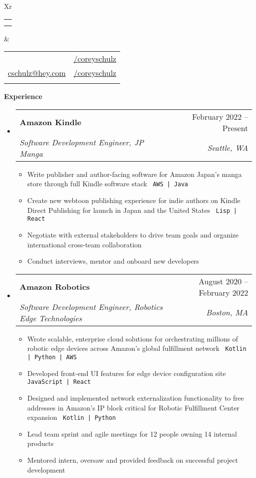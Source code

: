 \documentclass[letterpaper,12pt]{article}[leftmargin=*]
\makeatletter
\def \fullname {Corey Schulz}
\def \subtitle { } %
\def \linkedinicon {\faLinkedin}
\def \linkedinlink {https://linkedin.com/in/coreyschulz/}
\def \linkedintext {/coreyschulz}
\def \phoneicon {\faPhone}
\def \phonetext {801.898.6226}
\def \emailicon {\faEnvelope}
\def \emaillink {mailto:cschulz@hey.com}
\def \emailtext {cschulz@hey.com}
\def \githubicon {\faGithub}
\def \githublink {https://github.com/coreyschulz}
\def \githubtext {/coreyschulz}
\def \psicon {\faPlaystation}
\def \headertype {\doublecol} %
\def \entryspacing {-0pt}
\def \linkedin {\linkedinicon \hspace{3pt}\href{\linkedinlink}{\linkedintext}}
\def \phone {\phoneicon \hspace{3pt}{ \phonetext}}
\def \email {\emailicon \hspace{3pt}\href{\emaillink}{\emailtext}}
\def \github {\githubicon \hspace{3pt}\href{\githublink}{\githubtext}}
\def \website {}
\renewcommand{\section}[2]{\vspace{5pt}
  \colorbox{secondary}{\color{white}\raggedbottom\normalsize\textbf{{#1}{\hspace{7pt}#2}}}
}
\newcommand{\resumeEntryStart}{\begin{itemize}[leftmargin=2.5mm]}
\newcommand{\resumeEntryEnd}{\end{itemize}\vspace{\entryspacing}}
\def\code#1{\texttt{#1}}
\newcommand{\resumeItemListStart}{\begin{itemize}[leftmargin=4.5mm]}
\newcommand{\resumeItemListEnd}{\end{itemize}}
\newcommand{\resumeItem}[1]{
  \item\small{
    {#1 \vspace{-2pt}}
  }
}
\newcommand{\resumeEntryTSDL}[4]{
  \vspace{-1pt}\item[]
    \begin{tabularx}{0.97\textwidth}{X@{\hspace{60pt}}r}
      \textbf{\color{primary}#1} & {\firabook\color{accent}\small#2} \\
      \textit{\color{accent}\small#3} & \textit{\color{accent}\small#4} \\
    \end{tabularx}\vspace{-6pt}
}
\newcommand{\doublecol}[6]{
  \begin{tabularx}{\textwidth}{Xr}
    {
      \begin{tabular}[c]{l}
        \fontsize{35}{45}\selectfont{\color{primary}{{\textbf{\fullname}}}} \\
        {\textit{\subtitle}} %
      \end{tabular}
    } & {
      \begin{tabular}[c]{l@{\hspace{1.5em}}l}
        {\small#4} & {\small#1} \\
        {\small#5} & {\small#2} \\
        {\small#6} & {\small#3}
      \end{tabular}
    }
  \end{tabularx}
}
\newcommand{\singlecol}[6]{
  \begin{tabularx}{\textwidth}{Xr}
    {
      \begin{tabular}[b]{l}
        \fontsize{35}{45}\selectfont{\color{primary}{{\textbf{\fullname}}}} \\
        {\textit{\subtitle}} %
      \end{tabular}
    } & {
      \begin{tabular}[c]{l}
        {\small#1} \\
        {\small#2} \\
        {\small#3} \\
        {\small#4} \\
        {\small#5} \\
        {\small#6}
      \end{tabular}
    }
  \end{tabularx}
}
\makeatother
\begin{document}


\headertype{\linkedin}{\github}{\website}{\phone}{\email}{} %
\vspace{-2pt} %


\section{\faCode}{Experience}


  \resumeEntryStart
    \resumeEntryTSDL
      {\faAmazon \hspace{3pt} Amazon Kindle}{February 2022 -- Present}
      {Software Development Engineer, JP Manga}{Seattle, WA}
    \resumeItemListStart
      \resumeItem {Write publisher and author-facing software for Amazon Japan's manga store through full Kindle software stack \code{ AWS | Java }}
      \resumeItem {Create new webtoon publishing experience for indie authors on Kindle Direct Publishing for launch in Japan and the United States \code{ Lisp | React}}
      \resumeItem {Negotiate with external stakeholders to drive team goals and organize international cross-team collaboration }
      \resumeItem {Conduct interviews, mentor and onboard new developers}
      
    \resumeItemListEnd
  \resumeEntryEnd

  \resumeEntryStart
    \resumeEntryTSDL
      {\faAmazon \hspace{3pt} Amazon Robotics}{August 2020 -- February 2022}
      {Software Development Engineer, Robotics Edge Technologies}{Boston, MA}
    \resumeItemListStart
      \resumeItem {Wrote scalable, enterprise cloud solutions for orchestrating millions of robotic edge devices across Amazon's global fulfillment network \code{ Kotlin | Python | AWS}}
      \resumeItem {Developed front-end UI features for edge device configuration site  \code{ JavaScript | React}}
      \resumeItem {Designed and implemented network externalization functionality to free addresses in Amazon's IP block critical for Robotic Fulfillment Center expansion \code{ Kotlin | Python}}
      \resumeItem {Lead team sprint and agile meetings for 12 people owning 14 internal products}
      \resumeItem {Mentored intern, oversaw and provided feedback on successful project development}      
    \resumeItemListEnd
  \resumeEntryEnd
\end{document}

